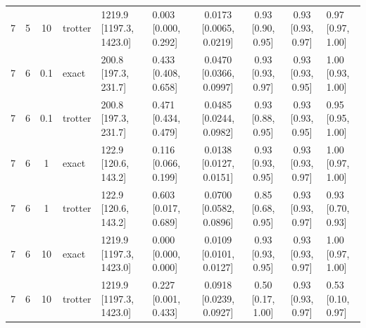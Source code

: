\begin{tabular}{ccclllccc}
7 & 5 & 10 & trotter & 1219.9 [1197.3, 1423.0] & 0.003 [0.000, 0.292] & 0.0173 [0.0065, 0.0219] & 0.93 [0.90, 0.95] & 0.93 [0.93, 0.97] & 0.97 [0.97, 1.00] \\
7 & 6 & 0.1 & exact & 200.8 [197.3, 231.7] & 0.433 [0.408, 0.658] & 0.0470 [0.0366, 0.0997] & 0.93 [0.93, 0.97] & 0.93 [0.93, 0.95] & 1.00 [0.93, 1.00] \\
7 & 6 & 0.1 & trotter & 200.8 [197.3, 231.7] & 0.471 [0.434, 0.479] & 0.0485 [0.0244, 0.0982] & 0.93 [0.88, 0.95] & 0.93 [0.93, 0.95] & 0.95 [0.95, 1.00] \\
7 & 6 & 1 & exact & 122.9 [120.6, 143.2] & 0.116 [0.066, 0.199] & 0.0138 [0.0127, 0.0151] & 0.93 [0.93, 0.95] & 0.93 [0.93, 0.97] & 1.00 [0.97, 1.00] \\
7 & 6 & 1 & trotter & 122.9 [120.6, 143.2] & 0.603 [0.017, 0.689] & 0.0700 [0.0582, 0.0896] & 0.85 [0.68, 0.95] & 0.93 [0.93, 0.97] & 0.93 [0.70, 0.93] \\
7 & 6 & 10 & exact & 1219.9 [1197.3, 1423.0] & 0.000 [0.000, 0.000] & 0.0109 [0.0101, 0.0127] & 0.93 [0.93, 0.95] & 0.93 [0.93, 0.97] & 1.00 [0.97, 1.00] \\
7 & 6 & 10 & trotter & 1219.9 [1197.3, 1423.0] & 0.227 [0.001, 0.433] & 0.0918 [0.0239, 0.0927] & 0.50 [0.17, 1.00] & 0.93 [0.93, 0.97] & 0.53 [0.10, 0.97] \\
\hline
\end{tabular}

